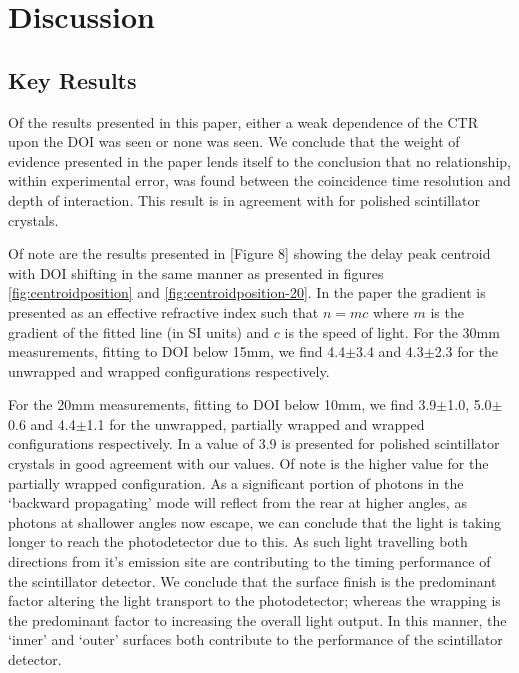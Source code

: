\section{Discussion}
\subsection{Key Results}
Of the results presented in this paper, either a weak dependence of the CTR upon the DOI was seen or none was seen. We conclude that the weight of evidence presented in the paper lends itself to the conclusion that no relationship, within experimental error, was found between the coincidence time resolution and depth of interaction. This result is in agreement with \cite{Bircher_Shao_2012} for polished scintillator crystals. 


Of note are the results presented in [Figure 8]\cite{Moses_Derenzo_1999} showing the delay peak centroid with DOI shifting in the same manner as presented in figures \ref{fig:centroidposition} and \ref{fig:centroidposition-20}. In the paper the gradient is presented as an effective refractive index such that $n=mc$ where $m$ is the gradient of the fitted line (in SI units) and $c$ is the speed of light. For the 30mm measurements, fitting to DOI below 15mm, we find 4.4$\pm$3.4 and 4.3$\pm$2.3 for the unwrapped and wrapped configurations respectively. 


For the 20mm measurements, fitting to DOI below 10mm, we find 3.9$\pm$1.0, 5.0$\pm$0.6 and 4.4$\pm$1.1 for the unwrapped, partially wrapped and wrapped configurations respectively. In \cite{Moses_Derenzo_1999} a value of 3.9 is presented for polished scintillator crystals in good agreement with our values. Of note is the higher value for the partially wrapped configuration. As a significant portion of photons in the `backward propagating' mode will reflect from the rear at higher angles, as photons at shallower angles now escape, we can conclude that the light is taking longer to reach the photodetector due to this. As such light travelling both directions from it's emission site are contributing to the timing performance of the scintillator detector. We conclude that the surface finish is the predominant factor altering the light transport to the photodetector; whereas the wrapping is the predominant factor to increasing the overall light output. In this manner, the `inner' and `outer' surfaces both contribute to the performance of the scintillator detector.